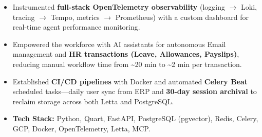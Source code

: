 \documentclass[a4paper,10pt]{article}
\begin{document}
\begin{itemize}[noitemsep,topsep=0pt,leftmargin=*]
    \item Instrumented \textbf{full-stack OpenTelemetry observability} (logging $\rightarrow$ Loki, tracing $\rightarrow$ Tempo, metrics $\rightarrow$ Prometheus) with a custom dashboard for real-time agent performance monitoring.
    \item Empowered the workforce with AI assistants for autonomous Email management and \textbf{HR transactions (Leave, Allowances, Payslips)}, reducing manual workflow time from \textasciitilde20 min to \textasciitilde2 min per transaction.
    \item Established \textbf{CI/CD pipelines} with Docker and automated \textbf{Celery Beat} scheduled tasks---daily user sync from ERP and \textbf{30-day session archival} to reclaim storage across both Letta and PostgreSQL.
    \item \textbf{Tech Stack:} Python, Quart, FastAPI, PostgreSQL (pgvector), Redis, Celery, GCP, Docker, OpenTelemetry, Letta, MCP.
\end{itemize}

\vspace{0.2cm}
\end{document}
